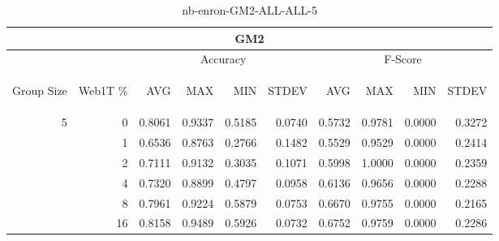 \begin{center}
\begin{table}[htbp] 
 \begin{center}
\begin{tabular}{ | r | r | r | r | r | r | r | r | r | r |}
\hline
\multicolumn{10}{|c|}{GM2}\\
\hline
 & & \multicolumn{4}{|c|}{Accuracy} & \multicolumn{4}{|c|}{F-Score}\\ \cline{3-10}
\begin{sideways}Group Size\end{sideways} & \begin{sideways}Web1T \%\end{sideways} & \begin{sideways}AVG\end{sideways} & \begin{sideways}MAX\end{sideways} & \begin{sideways}MIN\end{sideways} & \begin{sideways}STDEV\end{sideways} & \begin{sideways}AVG\end{sideways} & \begin{sideways}MAX\end{sideways} & \begin{sideways}MIN\end{sideways} & \begin{sideways}STDEV\end{sideways}\\
\hline
\multirow{5}{*}{5}
 & 0 & 0.8061 & 0.9337 & 0.5185 & 0.0740 & 0.5732 & 0.9781 & 0.0000 & 0.3272\\ \cline{2-10}
 & 1 & 0.6536 & 0.8763 & 0.2766 & 0.1482 & 0.5529 & 0.9529 & 0.0000 & 0.2414\\ \cline{2-10}
 & 2 & 0.7111 & 0.9132 & 0.3035 & 0.1071 & 0.5998 & 1.0000 & 0.0000 & 0.2359\\ \cline{2-10}
 & 4 & 0.7320 & 0.8899 & 0.4797 & 0.0958 & 0.6136 & 0.9656 & 0.0000 & 0.2288\\ \cline{2-10}
 & 8 & 0.7961 & 0.9224 & 0.5879 & 0.0753 & 0.6670 & 0.9755 & 0.0000 & 0.2165\\ \cline{2-10}
 & 16 & 0.8158 & 0.9489 & 0.5926 & 0.0732 & 0.6752 & 0.9759 & 0.0000 & 0.2286\\ \cline{2-10}
\hline
\end{tabular}
\caption{nb-enron-GM2-ALL-ALL-5}
\label{table:nb-enron-GM2-ALL-ALL-5}
\end{center}
 \end{table}
\end{center}

